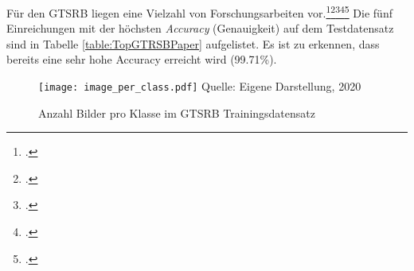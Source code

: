 Für den \ac{GTSRB} liegen eine Vielzahl von Forschungsarbeiten vor.\footcite[Vgl.][S. 158 - 165]{arcos-garciaDeepNeuralNetwork2018}\footcite[Vgl.][165-174]{gecerColorblobbasedCOSFIREFilters2017}\footcite[Vgl.][S. 333-33]{ciresanMulticolumnDeepNeural2012}\footcite[Vgl.][S. 323-332]{Stallkamp2012}\footcite[Vgl.][S. 2809-2813]{sermanetTrafficSignRecognition2011} Die fünf Einreichungen mit der höchsten \textit{Accuracy} (Genauigkeit) auf dem Testdatensatz sind in Tabelle \ref{table:TopGTRSBPaper} aufgelistet. Es ist zu erkennen, dass bereits eine sehr hohe Accuracy erreicht wird (99.71\%). 


\begin{figure}[t]
    \centering
    \caption[]{Anzahl Bilder pro Klasse im GTSRB Trainingsdatensatz}
	\label{fig:overviewClassesGTSRB}
    \texttt{[image: image\_per\_class.pdf]}
    Quelle: Eigene Darstellung, 2020
\end{figure}



